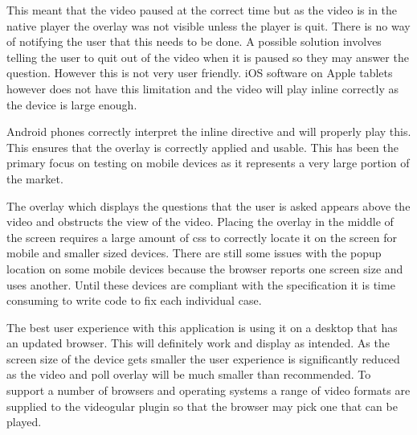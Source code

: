 This meant that the video paused at the correct time but as the video is in the native player the overlay was not visible unless the player is quit. There is no way of notifying the user that this needs to be done. A possible solution involves telling the user to quit out of the video when it is paused so they may answer the question. However this is not very user friendly. iOS software on Apple tablets however does not have this limitation and the video will play inline correctly as the device is large enough.

Android phones correctly interpret the inline directive and will properly play this. This ensures that the overlay is correctly applied and usable. This has been the primary focus on testing on mobile devices as it represents a very large portion of the market.

The overlay which displays the questions that the user is asked appears above the video and obstructs the view of the video. Placing the overlay in the middle of the screen requires a large amount of css to correctly locate it on the screen for mobile and smaller sized devices. There are still some issues with the popup location on some mobile devices because the browser reports one screen size and uses another. Until these devices are compliant with the specification it is time consuming to write code to fix each individual case.

The best user experience with this application is using it on a desktop that has an updated browser. This will definitely work and display as intended. As the screen size of the device gets smaller the user experience is significantly reduced as the video and poll overlay will be much smaller than recommended. To support a number of browsers and operating systems a range of video formats are supplied to the videogular plugin so that the browser may pick one that can be played.